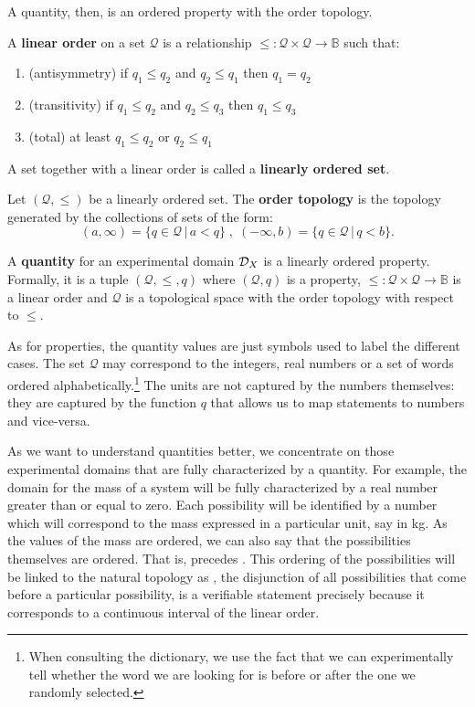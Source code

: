 A quantity, then, is an ordered property with the order topology.

\begin{mathSection}
	\begin{defn}
		A \textbf{linear order} on a set $\mathcal{Q}$ is a relationship $\leq : \mathcal{Q} \times \mathcal{Q} \to \mathbb{B}$ such that:
		\begin{enumerate}
			\item (antisymmetry) if $q_1 \leq q_2$ and $q_2 \leq q_1$ then $q_1 = q_2$
			\item (transitivity) if $q_1 \leq q_2$ and $q_2 \leq q_3$ then $q_1 \leq q_3$
			\item (total) at least $q_1 \leq q_2$ or $q_2 \leq q_1$
		\end{enumerate}
		A set together with a linear order is called a \textbf{linearly ordered set}.
	\end{defn}
	\begin{defn}
		Let $(\mathcal{Q}, \leq )$ be a linearly ordered set. The \textbf{order topology} is the topology generated by the collections of sets of the form:
		$$(a, \infty) = \{q \in \mathcal{Q} \, | \, a < q\} \;,\; (-\infty, b) = \{q \in \mathcal{Q} \, | \, q < b\}.$$
	\end{defn}
	\begin{defn}
		A \textbf{quantity} for an experimental domain $\mathcal{D}_X$ is a linearly ordered property. Formally, it is a tuple $(\mathcal{Q}, \leq, q)$ where $(\mathcal{Q}, q)$ is a property, $\leq : \mathcal{Q} \times \mathcal{Q} \to \mathbb{B}$ is a linear order and $\mathcal{Q}$ is a topological space with the order topology with respect to $\leq$.
	\end{defn}
\end{mathSection}

As for properties, the quantity values are just symbols used to label the different cases. The set $\mathcal{Q}$ may correspond to the integers, real numbers or a set of words ordered alphabetically.\footnote{When consulting the dictionary, we use the fact that we can experimentally tell whether the word we are looking for is before or after the one we randomly selected.} The units are not captured by the numbers themselves: they are captured by the function $q$ that allows us to map statements to numbers and vice-versa.

As we want to understand quantities better, we concentrate on those experimental domains that are fully characterized by a quantity. For example, the domain for the mass of a system will be fully characterized by a real number greater than or equal to zero. Each possibility will be identified by a number which will correspond to the mass expressed in a particular unit, say in kg. As the values of the mass are ordered, we can also say that the possibilities themselves are ordered. That is,  precedes . This ordering of the possibilities will be linked to the natural topology as , the disjunction of all possibilities that come before a particular possibility, is a verifiable statement precisely because it corresponds to a continuous interval of the linear order.

